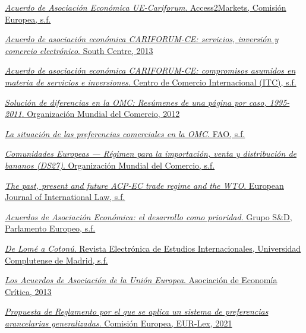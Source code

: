 \documentclass[10pt,a4paper]{article}
\begin{document}
\href{https://trade.ec.europa.eu/access-to-markets/es/content/acuerdo-de-asociacion-economica-ue-cariforum}{\textit{Acuerdo de Asociación Económica UE-Cariforum}. Access2Markets, Comisión Europea, s.f.}

\href{https://www.southcentre.int/wp-content/uploads/2013/08/AN_EPA18_The-EU-CARIFORUM-EPA-on-Services-Investment-and-E-Commerce_ES.pdf}{\textit{Acuerdo de asociación económica CARIFORUM-CE: servicios, inversión y comercio electrónico}. South Centre, 2013}

\href{https://www.intracen.org/es/recursos/publicaciones/acuerdo-de-asociacion-economica-cariforum-ce-compromisos-asumidos-en-materia}{\textit{Acuerdo de asociación económica CARIFORUM-CE: compromisos asumidos en materia de servicios e inversiones}. Centro de Comercio Internacional (ITC), s.f.}

\href{https://www.wto.org/spanish/res_s/booksp_s/dispu_summary95_11_s.pdf}{\textit{Solución de diferencias en la OMC: Resúmenes de una página por caso, 1995-2011}. Organización Mundial del Comercio, 2012}

\href{https://www.fao.org/4/Y2732S/y2732s08.htm}{\textit{La situación de las preferencias comerciales en la OMC}. FAO, s.f.}

\href{https://www.wto.org/spanish/tratop_s/dispu_s/cases_s/ds27_s.htm}{\textit{Comunidades Europeas — Régimen para la importación, venta y distribución de bananos (DS27)}. Organización Mundial del Comercio, s.f.}

\href{https://www.ejil.org/article.php?article=535&issue=40}{\textit{The past, present and future ACP-EC trade regime and the WTO}. European Journal of International Law, s.f.}

\href{https://www.socialistsanddemocrats.eu/sites/default/files/2857_ES_EPA_Brochure_PSE_ES-web_6.pdf}{\textit{Acuerdos de Asociación Económica: el desarrollo como prioridad}. Grupo S\&D, Parlamento Europeo, s.f.}

\href{https://revistas.ucm.es/index.php/REDC/article/download/86897/4564456563263}{\textit{De Lomé a Cotonú}. Revista Electrónica de Estudios Internacionales, Universidad Complutense de Madrid, s.f.}

\href{https://www.asociacioneconomiacritica.org/wp-content/themes/vantage/JEC_old/jec13/Ponencias/economia%20mundial/LOS%20ACUERDOS%20DE%20ASOCIACION%20DE%20LA%20UNION.pdf}{\textit{Los Acuerdos de Asociación de la Unión Europea}. Asociación de Economía Crítica, 2013}

\href{https://eur-lex.europa.eu/legal-content/ES/TXT/HTML/?uri=CELEX%3A52021PC0579}{\textit{Propuesta de Reglamento por el que se aplica un sistema de preferencias arancelarias generalizadas}. Comisión Europea, EUR-Lex, 2021}
\end{document}
